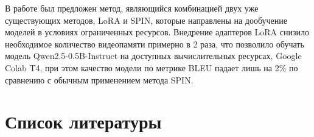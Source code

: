 \documentclass[12pt, twoside]{article}
\begin{document}
В работе был предложен метод, являющийся комбинацией двух уже существующих методов, LoRA и SPIN, которые направлены на дообучение моделей в условиях ограниченных ресурсов. Внедрение адаптеров LoRA снизило необходимое количество видеопамяти примерно в 2 раза, что позволило обучать модель Qwen2.5-0.5B-Instruct на доступных вычислительных ресурсах, Google Colab T4, при этом качество модели по метрике BLEU падает лишь на 2\% по сравнению с обычным применением метода SPIN.

\section{Список литературы}

\bigskip

\printbibliography[heading=none]
\end{document}
